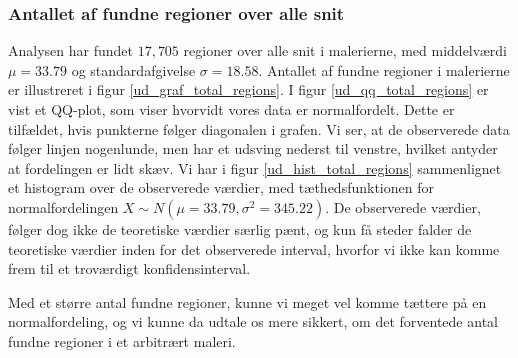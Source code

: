{\subsubsection{Antallet af fundne regioner over alle snit}
Analysen har fundet $17,705$ regioner over alle snit i malerierne, med
middelværdi $\mu = 33.79$ og standardafgivelse $\sigma = 18.58$.
Antallet af fundne regioner i malerierne er illustreret i figur
\ref{ud_graf_total_regions}. I figur \ref{ud_qq_total_regions} er vist
et QQ-plot, som viser hvorvidt vores data er normalfordelt. Dette er
tilfældet, hvis punkterne følger diagonalen i grafen. Vi ser, at de
observerede data følger linjen nogenlunde, men har et udsving nederst
til venstre, hvilket antyder at fordelingen er lidt skæv. Vi har i figur
\ref{ud_hist_total_regions} sammenlignet et histogram over de
observerede værdier, med tæthedsfunktionen for normalfordelingen $X \sim
N(\mu = 33.79, \sigma^2 = 345.22)$. De observerede værdier, følger dog
ikke de teoretiske værdier særlig pænt, og kun få steder falder de
teoretiske værdier inden for det observerede interval, hvorfor vi ikke
kan komme frem til et troværdigt konfidensinterval.

Med et større antal fundne regioner, kunne vi meget vel komme tættere på
en normalfordeling, og vi kunne da udtale os mere sikkert, om det
forventede antal fundne regioner i et arbitrært maleri.

}
